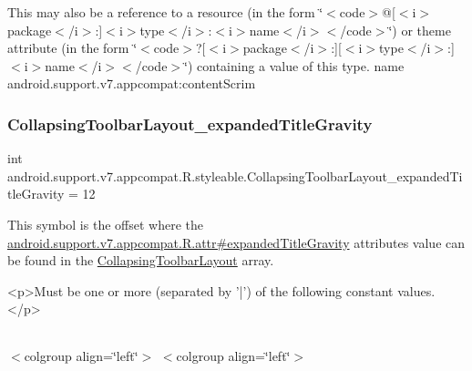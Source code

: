 This may also be a reference to a resource (in the form \char`\"{}$<$code$>$@\mbox{[}$<$i$>$package$<$/i$>$\+:\mbox{]}$<$i$>$type$<$/i$>$\+:$<$i$>$name$<$/i$>$$<$/code$>$\char`\"{}) or theme attribute (in the form \char`\"{}$<$code$>$?\mbox{[}$<$i$>$package$<$/i$>$\+:\mbox{]}\mbox{[}$<$i$>$type$<$/i$>$\+:\mbox{]}$<$i$>$name$<$/i$>$$<$/code$>$\char`\"{}) containing a value of this type.  name android.\+support.\+v7.\+appcompat\+:content\+Scrim \mbox{\label{classandroid_1_1support_1_1v7_1_1appcompat_1_1R_1_1styleable_adbe8dfae693ce3de1ae6617648f8652c}} 
\subsubsection{\texorpdfstring{Collapsing\+Toolbar\+Layout\+\_\+expanded\+Title\+Gravity}{CollapsingToolbarLayout\_expandedTitleGravity}}
{\footnotesize\ttfamily int android.\+support.\+v7.\+appcompat.\+R.\+styleable.\+Collapsing\+Toolbar\+Layout\+\_\+expanded\+Title\+Gravity = 12\hspace{0.3cm}{\ttfamily [static]}}

This symbol is the offset where the \hyperlink{classandroid_1_1support_1_1v7_1_1appcompat_1_1R_1_1attr_a08627166561727866e3653cd31edcaed}{android.\+support.\+v7.\+appcompat.\+R.\+attr\#expanded\+Title\+Gravity} attribute\textquotesingle{}s value can be found in the \hyperlink{classandroid_1_1support_1_1v7_1_1appcompat_1_1R_1_1styleable_a8d282d917f35e5a08dd37db243410383}{Collapsing\+Toolbar\+Layout} array.

\begin{DoxyVerb}      <p>Must be one or more (separated by '|') of the following constant values.</p>
\end{DoxyVerb}
 \tabulinesep=1mm
\begin{longtabu} spread 0pt [c]{*{0}{|X[-1]}|}
\hline
\end{longtabu}
$<$colgroup align=\char`\"{}left\char`\"{}$>$ $<$colgroup align=\char`\"{}left\char`\"{}$>$ 

